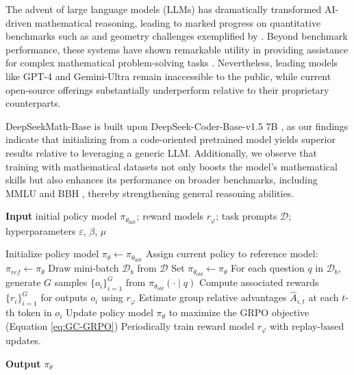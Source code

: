 The advent of large language models (LLMs) has dramatically transformed AI-driven mathematical reasoning, leading to marked progress on quantitative benchmarks such as \citep{MATH} and geometry challenges exemplified by \citep{trinh2024solving}. Beyond benchmark performance, these systems have shown remarkable utility in providing assistance for complex mathematical problem-solving tasks \citep{tao}. Nevertheless, leading models like GPT-4 \citep{gpt4} and Gemini-Ultra \citep{gemini} remain inaccessible to the public, while current open-source offerings substantially underperform relative to their proprietary counterparts.

DeepSeekMath-Base is built upon DeepSeek-Coder-Base-v1.5 7B \citep{deepseek-coder}, as our findings indicate that initializing from a code-oriented pretrained model yields superior results relative to leveraging a generic LLM. Additionally, we observe that training with mathematical datasets not only boosts the model's mathematical skills but also enhances its performance on broader benchmarks, including MMLU \citep{mmlu} and BBH \citep{bbh}, thereby strengthening general reasoning abilities.

\begin{algorithm}[t]
  \small
  \caption{Iterative Group Relative Policy Optimization}
  \textbf{Input} initial policy model $\pi_{\theta_{\text{init}}}$; reward models $r_\varphi$; task prompts $\mathcal{D}$; 
  hyperparameters $\varepsilon$, $\beta$, $\mu$
  \begin{algorithmic}[1]
    \State Initialize policy model $\pi_\theta \leftarrow \pi_{\theta_{\text{init}}}$
      \State Assign current policy to reference model: $\pi_{ref} \leftarrow \pi_{\theta}$
        \State Draw mini-batch $\mathcal{D}_b$ from $\mathcal{D}$
        \State Set $\pi_{\theta_{old}} \leftarrow \pi_{\theta}$ 
        \State For each question $q$ in $\mathcal{D}_b$, generate $G$ samples $\{o_i\}_{i=1}^G$ from $\pi_{\theta_{old}} (\cdot \mid q)$
        \State Compute associated rewards $\{r_i\}_{i=1}^{G}$ for outputs $o_i$ using $r_{\varphi}$
        \State Estimate group relative advantages $\hat{A}_{i,t}$ at each $t$-th token in $o_i$
          \State Update policy model $\pi_{\theta}$ to maximize the GRPO objective (Equation \ref{eq:GC-GRPO})
        \EndFor
      \EndFor 
      \State Periodically train reward model $r_\varphi$ with replay-based updates.
    \EndFor 
  \end{algorithmic}
  \textbf{Output} $\pi_\theta$
  \label{alg:iter-grpo}
\end{algorithm}

